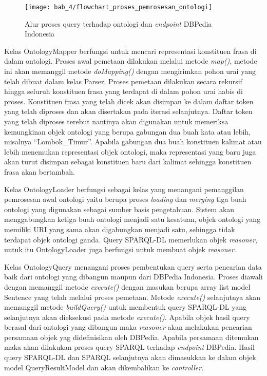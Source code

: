 \begin{figure}[ht]
    \centering
    \texttt{[image: bab\_4/flowchart\_proses\_pemrosesan\_ontologi]}
    \caption{Alur proses query terhadap ontologi dan \emph{endpoint} DBPedia Indonesia}
    \label{fig:flowchart_pemrosesan_ontologi}
\end{figure}

Kelas OntologyMapper berfungsi untuk mencari representasi konstituen frasa di dalam ontologi. Proses awal pemetaan dilakukan melalui metode \emph{map()}, metode ini akan memanggil metode \emph{doMapping()} dengan mengirimkan pohon urai yang telah dibuat dalam kelas Parser. Proses pemetaan dilakukan secara rekursif hingga seluruh konstituen frasa yang terdapat di dalam pohon urai habis di proses. Konstituen frasa yang telah dicek akan disimpan ke dalam daftar token yang telah diproses dan akan disertakan pada iterasi selanjutnya. Daftar token yang telah diproses terebut nantinya akan digunakan untuk memeriksa kemungkinan objek ontologi yang berupa gabungan dua buah kata atau lebih, misalnya ``Lombok\_Timur''. Apabila gabungan dua buah konstituen kalimat atau lebih menemukan representasi objek ontologi, maka representasi yang baru juga akan turut disimpan sebagai konstituen baru dari kalimat sehingga konstituen frasa akan bertambah.

Kelas OntologyLoader berfungsi sebagai kelas yang menangani pemanggilan pemrosesan awal ontologi yaitu berupa proses \emph{loading} dan \emph{merging} tiga buah ontologi yang digunakan sebagai sumber basis pengetahuan. Sistem akan menggabungkan ketiga buah ontologi menjadi satu kesatuan, objek ontologi yang memiliki URI yang sama akan digabungkan menjadi satu, sehingga tidak terdapat objek ontologi ganda. Query SPARQL-DL memerlukan objek \emph{reasoner}, untuk itu OntologyLoader juga berfungsi untuk membuat objek \emph{reasoner}. 

Kelas OntologyQuery menangani proses pembentukan query serta pencarian data baik dari ontologi yang dibangun maupun dari DBPedia Indonesia. Proses diawali dengan memanggil metode \emph{execute()} dengan masukan berupa array list model Sentence yang telah melalui proses pemetaan. Metode \emph{execute()} selanjutnya akan memanggil metode \emph{buildQuery()} untuk membentuk query SPARQL-DL yang selanjutnya akan dieksekusi pada metode \emph{execute()}. Apabila objek hasil query berasal dari ontologi yang dibangun maka \emph{reasoner} akan melakukan pencarian persamaan objek yag didefinisikan oleh DBPedia. Apabila persamaan ditemukan maka akan dilakukan proses query SPARQL terhadap \emph{endpoint} DBPedia. Hasil query SPARQL-DL dan SPARQL selanjutnya akan dimasukkan ke dalam objek model QueryResultModel dan akan dikembalikan ke \emph{controller}.
